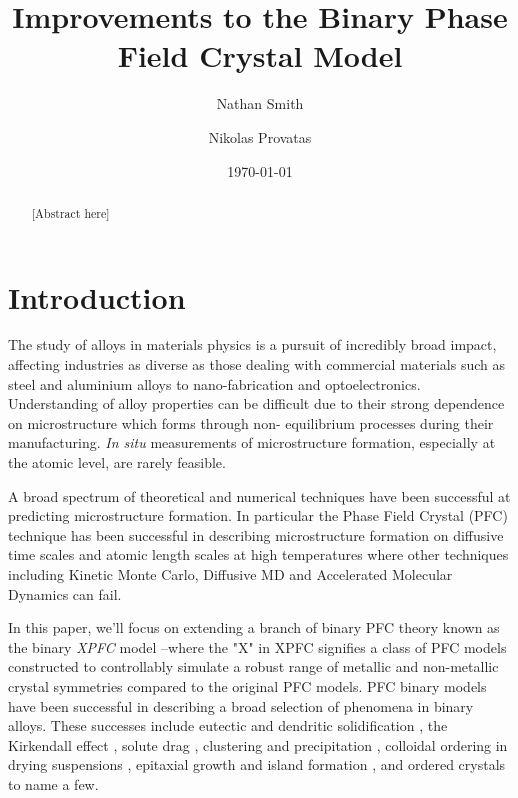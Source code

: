 \documentclass[showkeys, prb, reprint]{revtex4-1}
\begin{document}

\title{Improvements to the  Binary Phase Field Crystal Model}
\author{Nathan Smith}
\author{Nikolas Provatas}
\date{\today}

\begin{abstract}

[Abstract here]

\end{abstract}


\maketitle


\section{Introduction} %



The study of alloys in materials physics is a pursuit of incredibly broad
impact, affecting industries as diverse as those dealing with commercial
materials such as steel and aluminium alloys to nano-fabrication and
optoelectronics. Understanding of alloy properties can be difficult due to
their strong dependence on microstructure which forms through non- equilibrium
processes during their manufacturing. \textit{In situ} measurements of
microstructure formation, especially at the atomic level, are rarely feasible.

A broad spectrum of theoretical and numerical techniques have been successful
at predicting microstructure formation. In particular the Phase Field Crystal
(PFC) technique has been successful in describing microstructure formation on
diffusive time scales and atomic length scales at high temperatures where other
techniques including Kinetic Monte Carlo, Diffusive MD and Accelerated
Molecular Dynamics can fail.


In this paper, we'll focus on extending a branch of binary PFC theory known as
the binary {\it XPFC} model --where the "X" in XPFC signifies a class of PFC
models  constructed to controllably simulate a robust range of metallic and
non-metallic crystal symmetries compared to the original PFC models. PFC binary
models have been successful in describing a broad selection of phenomena in
binary alloys.  These successes include eutectic and dendritic solidification
\cite{ELDER07}, the Kirkendall effect \cite{ELDER11_KIRKENDALL, LU15}, solute
drag \cite{GREENWOOD12}, clustering and precipitation \cite{FALLAH12, FALLAH13,
FALLAH13_AlCu_experiment}, colloidal ordering in drying suspensions
\cite{GANAI13}, epitaxial growth and island formation \cite{ELDER10_NANOISLAND,
LU16}, and ordered crystals \cite{ALSTER17} to name a few. 
\end{document}
